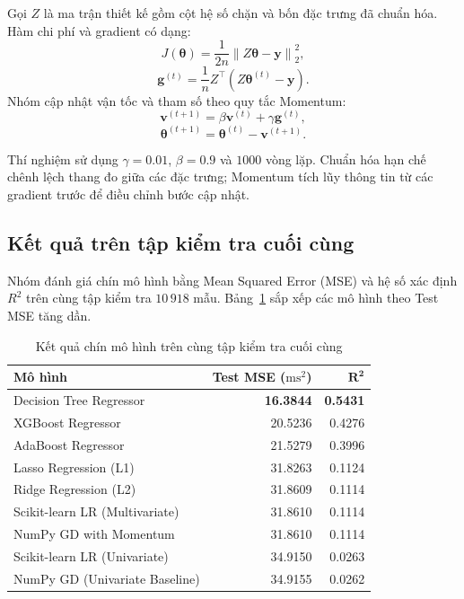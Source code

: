 Gọi $Z$ là ma trận thiết kế gồm cột hệ số chặn và bốn đặc trưng
đã chuẩn hóa. Hàm chi phí và gradient có dạng:
\[
    J(\boldsymbol{\theta})
    =\frac{1}{2n}\left\|Z\boldsymbol{\theta}-\mathbf{y}\right\|_2^2,
\]
\[
    \mathbf{g}^{(t)}
    =\frac{1}{n}Z^\top\left(Z\boldsymbol{\theta}^{(t)}-\mathbf{y}\right).
\]
Nhóm cập nhật vận tốc và tham số theo quy tắc Momentum:
\[
    \mathbf{v}^{(t+1)}
    =\beta\mathbf{v}^{(t)}+\gamma\mathbf{g}^{(t)},
\]
\[
    \boldsymbol{\theta}^{(t+1)}
    =\boldsymbol{\theta}^{(t)}-\mathbf{v}^{(t+1)}.
\]

Thí nghiệm sử dụng $\gamma=0.01$, $\beta=0.9$ và $1000$
vòng lặp. Chuẩn hóa hạn chế chênh lệch thang đo giữa các
đặc trưng; Momentum tích lũy thông tin từ các gradient trước
để điều chỉnh bước cập nhật.

\subsection{Kết quả trên tập kiểm tra cuối cùng}

Nhóm đánh giá chín mô hình bằng Mean Squared Error (MSE)
và hệ số xác định $R^2$ trên cùng tập kiểm tra $10\,918$ mẫu.
Bảng~\ref{tab:improvement-results} sắp xếp các mô hình theo
Test MSE tăng dần.

\begin{table}[H]
    \centering
    \caption{Kết quả chín mô hình trên cùng tập kiểm tra cuối cùng}
    \label{tab:improvement-results}
    \small
    \begin{tabular}{p{}rr}
        \toprule
        \textbf{Mô hình} & \textbf{Test MSE ($\mathrm{ms}^2$)}
        & $\boldsymbol{R^2}$ \\
        \midrule
        Decision Tree Regressor & \textbf{16.3844} & \textbf{0.5431} \\
        XGBoost Regressor & 20.5236 & 0.4276 \\
        AdaBoost Regressor & 21.5279 & 0.3996 \\
        Lasso Regression (L1) & 31.8263 & 0.1124 \\
        Ridge Regression (L2) & 31.8609 & 0.1114 \\
        Scikit-learn LR (Multivariate) & 31.8610 & 0.1114 \\
        NumPy GD with Momentum & 31.8610 & 0.1114 \\
        Scikit-learn LR (Univariate) & 34.9150 & 0.0263 \\
        NumPy GD (Univariate Baseline) & 34.9155 & 0.0262 \\
        \bottomrule
    \end{tabular}
\end{table}

